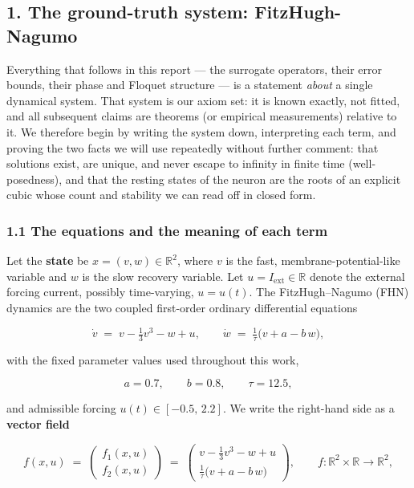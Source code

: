 \documentclass[
  11pt,
]{article}
\begin{document}
\subsection{1. The ground-truth system:
FitzHugh-Nagumo}\label{the-ground-truth-system-fitzhugh-nagumo}

Everything that follows in this report --- the surrogate operators,
their error bounds, their phase and Floquet structure --- is a statement
\emph{about} a single dynamical system. That system is our axiom set: it
is known exactly, not fitted, and all subsequent claims are theorems (or
empirical measurements) relative to it. We therefore begin by writing
the system down, interpreting each term, and proving the two facts we
will use repeatedly without further comment: that solutions exist, are
unique, and never escape to infinity in finite time (well-posedness),
and that the resting states of the neuron are the roots of an explicit
cubic whose count and stability we can read off in closed form.

\subsubsection{1.1 The equations and the meaning of each
term}\label{the-equations-and-the-meaning-of-each-term}

Let the \textbf{state} be \(x=(v,w)\in\mathbb{R}^2\), where \(v\) is the
fast, membrane-potential-like variable and \(w\) is the slow recovery
variable. Let \(u=I_{\mathrm{ext}}\in\mathbb{R}\) denote the external
forcing current, possibly time-varying, \(u=u(t)\). The FitzHugh--Nagumo
(FHN) dynamics are the two coupled first-order ordinary differential
equations

\[
\dot v \;=\; v-\tfrac{1}{3}v^{3}-w+u,
\qquad
\dot w \;=\; \tfrac{1}{\tau}\bigl(v+a-b\,w\bigr),
\tag{1.1}
\]

with the fixed parameter values used throughout this work,

\[
a=0.7,\qquad b=0.8,\qquad \tau=12.5,
\tag{1.2}
\]

and admissible forcing \(u(t)\in[-0.5,\,2.2]\). We write the right-hand
side as a \textbf{vector field}

\[
f(x,u)\;=\;\begin{pmatrix} f_1(x,u)\\[2pt] f_2(x,u)\end{pmatrix}
\;=\;\begin{pmatrix} v-\tfrac{1}{3}v^{3}-w+u\\[4pt] \tfrac{1}{\tau}\bigl(v+a-b\,w\bigr)\end{pmatrix},
\qquad f:\mathbb{R}^2\times\mathbb{R}\to\mathbb{R}^2,
\tag{1.3}
\]
\end{document}
